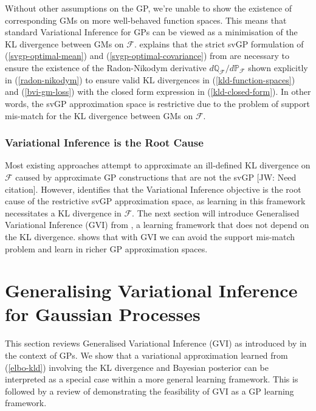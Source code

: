 \documentclass{article}
\newcommand{\jw}[1]{{\color{gray} [JW: #1]}}
\numberwithin{equation}{section}
\begin{document}
Without other assumptions on the GP, we're unable to show the existence of corresponding GMs on more well-behaved function spaces. This means that standard Variational Inference for GPs can be viewed as a minimisation of the KL divergence between GMs on $\mathcal{F}$. \cite{matthews2017scalable} explains that the strict svGP formulation of (\ref{svgp-optimal-mean}) and (\ref{svgp-optimal-covariance}) from \cite{titsias2009variational} are necessary to ensure the existence of the Radon-Nikodym derivative $d \mathbb{Q}_\mathcal{F}/d \mathbb{P}_\mathcal{F}$ shown explicitly in (\ref{radon-nikodym}) to ensure valid KL divergences in (\ref{kld-function-spaces}) and (\ref{bvi-gm-loss}) with the closed form expression in (\ref{kld-closed-form}). In other words, the svGP approximation space is restrictive due to the problem of support mis-match for the KL divergence between GMs on $\mathcal{F}$.

\subsubsection{Variational Inference is the Root Cause}
Most existing approaches attempt to approximate an ill-defined KL divergence on $\mathcal{F}$ caused by approximate GP constructions that are not the svGP \jw{Need citation}. However, \cite{wild2022generalized} identifies that the Variational Inference objective is the root cause of the restrictive svGP approximation space, as learning in this framework necessitates a KL divergence in $\mathcal{F}$. The next section will introduce Generalised Variational Inference (GVI) from \cite{knoblauch2022optimization}, a learning framework that does not depend on the KL divergence. \cite{wild2022generalized} shows that with GVI we can avoid the support mis-match problem and learn in richer GP approximation spaces.

\newpage
\section{Generalising Variational Inference for Gaussian Processes}
This section reviews Generalised Variational Inference (GVI) as introduced by \cite{knoblauch2022optimization} in the context of GPs. We show that a variational approximation learned from (\ref{elbo-kld}) involving the KL divergence and Bayesian posterior can be interpreted as a special case within a more general learning framework. This is followed by a review of \cite{wild2022generalized} demonstrating the feasibility of GVI as a GP learning framework.
\end{document}
